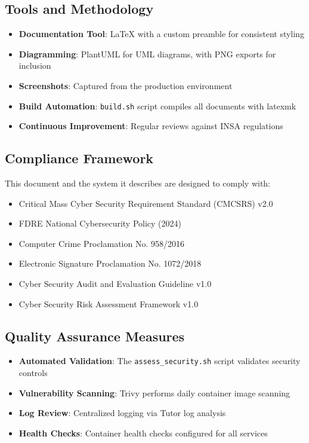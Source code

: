 \subsection{Tools and Methodology}
\begin{itemize}
    \item \textbf{Documentation Tool}: LaTeX with a custom preamble for consistent styling
    \item \textbf{Diagramming}: PlantUML for UML diagrams, with PNG exports for inclusion
    \item \textbf{Screenshots}: Captured from the production environment
    \item \textbf{Build Automation}: \texttt{build.sh} script compiles all documents with latexmk
    \item \textbf{Continuous Improvement}: Regular reviews against INSA regulations
\end{itemize}

\subsection{Compliance Framework}
This document and the system it describes are designed to comply with:
\begin{itemize}
    \item Critical Mass Cyber Security Requirement Standard (CMCSRS) v2.0
    \item FDRE National Cybersecurity Policy (2024)
    \item Computer Crime Proclamation No. 958/2016
    \item Electronic Signature Proclamation No. 1072/2018
    \item Cyber Security Audit and Evaluation Guideline v1.0
    \item Cyber Security Risk Assessment Framework v1.0
\end{itemize}

\subsection{Quality Assurance Measures}
\begin{itemize}
    \item \textbf{Automated Validation}: The \texttt{assess\_security.sh} script validates security controls
    \item \textbf{Vulnerability Scanning}: Trivy performs daily container image scanning
    \item \textbf{Log Review}: Centralized logging via Tutor log analysis
    \item \textbf{Health Checks}: Container health checks configured for all services
\end{itemize}


